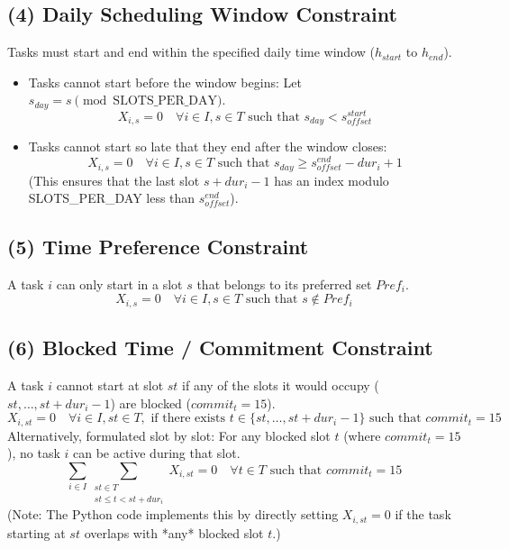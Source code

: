 \documentclass{article}
\begin{document}
\subsection{(4) Daily Scheduling Window Constraint}
Tasks must start and end within the specified daily time window ($h_{start}$ to $h_{end}$).
\begin{itemize}
    \item Tasks cannot start before the window begins: Let $s_{day} = s \pmod{\text{SLOTS\_PER\_DAY}}$.
    \[
    X_{i,s} = 0 \quad \forall i \in I, s \in T \text{ such that } s_{day} < s_{offset}^{start}
    \]
    \item Tasks cannot start so late that they end after the window closes:
    \[
    X_{i,s} = 0 \quad \forall i \in I, s \in T \text{ such that } s_{day} \ge s_{offset}^{end} - dur_i + 1
    \]
    (This ensures that the last slot $s + dur_i - 1$ has an index modulo SLOTS\_PER\_DAY less than $s_{offset}^{end}$).
\end{itemize}

\subsection{(5) Time Preference Constraint}
A task $i$ can only start in a slot $s$ that belongs to its preferred set $Pref_i$.
\[
X_{i,s} = 0 \quad \forall i \in I, s \in T \text{ such that } s \notin Pref_i
\]

\subsection{(6) Blocked Time / Commitment Constraint}
A task $i$ cannot start at slot $st$ if any of the slots it would occupy ($st, \dots, st + dur_i - 1$) are blocked ($commit_t = 15$).
\[
X_{i,st} = 0 \quad \forall i \in I, st \in T, \text{ if there exists } t \in \{st, \dots, st + dur_i - 1\} \text{ such that } commit_t = 15
\]
Alternatively, formulated slot by slot: For any blocked slot $t$ (where $commit_t=15$), no task $i$ can be active during that slot.
\[
\sum_{i \in I} \sum_{\substack{st \in T \\ st \le t < st + dur_i}} X_{i, st} = 0 \quad \forall t \in T \text{ such that } commit_t = 15
\]
(Note: The Python code implements this by directly setting $X_{i,st}=0$ if the task starting at $st$ overlaps with *any* blocked slot $t$.)
\end{document}
